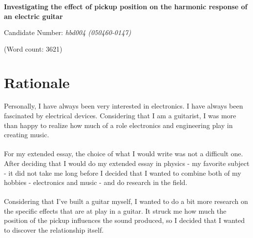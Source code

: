 \documentclass{article}
\begin{document}
\begin{titlepage}
	\begin{center}
		\hspace{0pt}
		\vfill
		\huge \textbf{Investigating the effect of pickup position on the
		harmonic response of an electric guitar}

		\vspace{1.0cm}
		\LARGE
		Candidate Number: \textit{hbd004 (050460-0147)}

		\large
		\vspace{0.5cm}
		\begin{flushright}
			(Word count: 3621)
		\end{flushright}

		\vfill
		\hspace{0pt}
	\end{center}
\end{titlepage}

\tableofcontents

\pagebreak


\section{Rationale}

\paragraph*{}
Personally, I have always been very interested in electronics. I have always
been fascinated by electrical devices. Considering that I am a guitarist, I was
more than happy to realize how much of a role electronics and engineering play
in creating music.

\paragraph*{}
For my extended essay, the choice of what I would write was not a difficult
one. After deciding that I would do my extended essay in physics - my favorite
subject - it did not take me long before I decided that I wanted to combine
both of my hobbies - electronics and music - and do research in the field.

\paragraph*{}
Considering that I've built a guitar myself, I wanted to do a bit more research
on the specific effects that are at play in a guitar. It struck me how much the
position of the pickup influences the sound produced, so I decided that I
wanted to discover the relationship itself.
\end{document}
